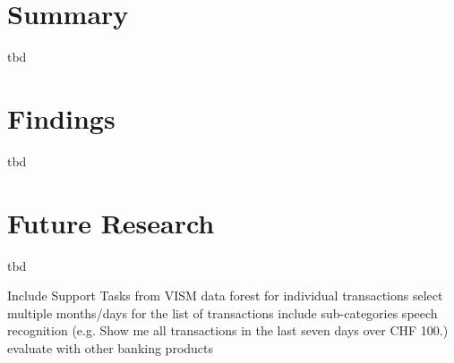 \section{Summary}

tbd




\section{Findings}

tbd




\section{Future Research}

tbd


Include Support Tasks from VISM \newline
data forest for individual transactions \newline
select multiple months/days for the list of transactions \newline
include sub-categories \newline
speech recognition (e.g. Show me all transactions in the last seven days over CHF 100.) \newline
evaluate with other banking products  \newline